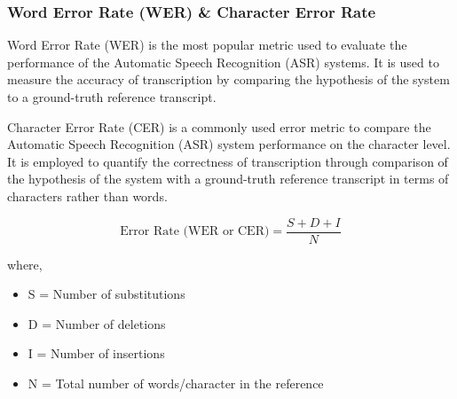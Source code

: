 \subsubsection{Word Error Rate (WER) & Character Error Rate}
Word Error Rate (WER) is the most popular metric used to evaluate the performance of the Automatic Speech Recognition (ASR) systems. It is used to measure the accuracy of transcription by comparing the hypothesis of the system to a ground-truth reference transcript.

Character Error Rate (CER) is a commonly used error metric to compare the Automatic Speech Recognition (ASR) system performance on the character level. It is employed to quantify the correctness of transcription through comparison of the hypothesis of the system with a ground-truth reference transcript in terms of characters rather than words.

\begin{equation}
\text{Error Rate (WER or CER)} = \frac{S + D + I}{N}
\end{equation}

where,
\begin{itemize}
	\item S = Number of substitutions
	\item D = Number of deletions
	\item I = Number of insertions 
	\item N = Total number of words/character in the reference
\end{itemize}
